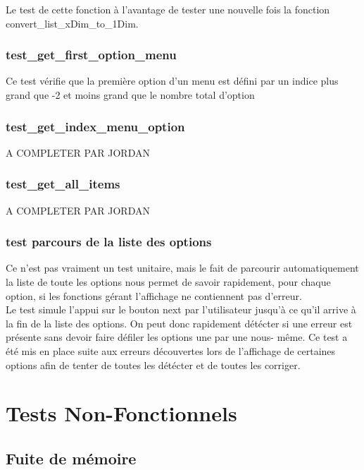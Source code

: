 \documentclass[16pts]{report}
\begin{document}
Le test de cette fonction à l'avantage de tester une nouvelle fois la 
fonction convert_list_xDim_to_1Dim.\\

\subsubsection{test_get_first_option_menu}

Ce test vérifie que la première option d'un menu est défini par un indice
plus grand que -2 et moins grand que le nombre total d'option\\

\subsubsection{test_get_index_menu_option}

A COMPLETER PAR JORDAN

\subsubsection{test_get_all_items}

A COMPLETER PAR JORDAN

\subsubsection{test parcours de la liste des options}

Ce n'est pas vraiment un test unitaire, mais le fait de parcourir 
automatiquement la liste de toute les options nous permet de savoir rapidement,
pour chaque option, si les fonctions gérant l'affichage ne contiennent pas 
d'erreur.\\
Le test simule l'appui sur le bouton next par l'utilisateur jusqu'à ce qu'il
arrive à la fin de la liste des options. On peut donc rapidement détécter si 
une erreur est présente sans devoir faire défiler les options une par une nous-
même. Ce test a été mis en place suite aux erreurs découvertes lors de
l'affichage de certaines options afin de tenter de toutes les détécter et de 
toutes les corriger.\\

\section{Tests Non-Fonctionnels}

\subsection{Fuite de mémoire}
\end{document}
